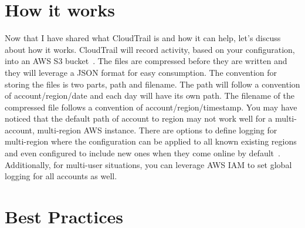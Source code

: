 \section{How it works}

Now that I have shared what CloudTrail is and how it can help, let’s discuss about how it works. CloudTrail will record activity, based on your configuration, into an AWS S3 bucket~\cite{hid-sp18-518-CloudTrail-log-example}. The files are compressed before they are written and they will leverage a JSON format for easy consumption. The convention for storing the files is two parts, path and filename. The path will follow a convention of account/region/date and each day will have its own path.  The filename of the compressed file follows a convention of account/region/timestamp. 
You may have noticed that the default path of account to region may not work well for a multi-account, multi-region AWS instance. There are options to define logging for multi-region where the configuration can be applied to all known existing regions and even configured to include new ones when they come online by default~\cite{hid-sp18-518-CloudTrail-global-events}. Additionally, for multi-user situations, you can leverage AWS IAM to set global logging for all accounts as well.

\section{Best Practices}

